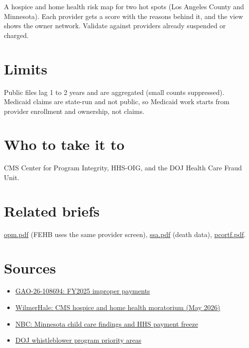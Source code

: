 \documentclass[letterpaper,11pt]{article}
\providecommand{\tightlist}{\setlength{\itemsep}{0pt}\setlength{\parskip}{0pt}}
\begin{document}
A hospice and home health risk map for two hot spots (Los Angeles County
and Minnesota). Each provider gets a score with the reasons behind it,
and the view shows the owner network. Validate against providers already
suspended or charged.

\hypertarget{limits}{%
\section{Limits}\label{limits}}

Public files lag 1 to 2 years and are aggregated (small counts
suppressed). Medicaid claims are state-run and not public, so Medicaid
work starts from provider enrollment and ownership, not claims.

\hypertarget{who-to-take-it-to}{%
\section{Who to take it to}\label{who-to-take-it-to}}

CMS Center for Program Integrity, HHS-OIG, and the DOJ Health Care Fraud
Unit.

\hypertarget{related-briefs}{%
\section{Related briefs}\label{related-briefs}}

\url{opm.pdf} (FEHB uses the same provider screen), \url{ssa.pdf} (death
data), \url{pcortf.pdf}.

\hypertarget{sources}{%
\section{Sources}\label{sources}}

\begin{itemize}
\tightlist
\item
  \href{https://www.gao.gov/products/gao-26-108694}{GAO-26-108694:
  FY2025 improper payments}
\item
  \href{https://www.wilmerhale.com/en/insights/client-alerts/20260521-cms-announces-moratorium-on-new-medicare-enrollment-for-hospices-and-home-health-agencies}{WilmerHale:
  CMS hospice and home health moratorium (May 2026)}
\item
  \href{https://www.nbcwashington.com/news/national-international/minnesota-department-finds-child-care-centers-targeted-viral-video-open/4036664/}{NBC:
  Minnesota child care findings and HHS payment freeze}
\item
  \href{https://www.justice.gov/fraud/whistleblower}{DOJ whistleblower
  program priority areas}
\end{itemize}
\end{document}
